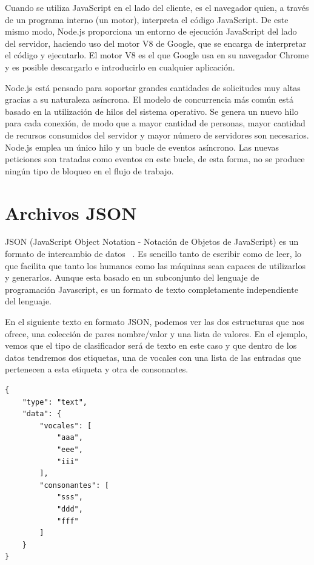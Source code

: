 \documentclass[a4paper, 12pt]{book}
\begin{document}
Cuando se utiliza JavaScript en el lado del cliente, es el navegador quien, a través de un programa interno (un motor), interpreta el código JavaScript. De este mismo modo, Node.js proporciona un entorno de ejecución JavaScript del lado del servidor, haciendo uso del motor V8 de Google, que se encarga de interpretar el código y ejecutarlo.
El motor V8 es el que Google usa en su navegador Chrome y es posible descargarlo e introducirlo en cualquier aplicación.

Node.js está pensado para soportar grandes cantidades de solicitudes muy altas gracias a su naturaleza asíncrona. El modelo de concurrencia más común está basado en la utilización de hilos del sistema operativo. Se genera un nuevo hilo para cada conexión, de modo que a mayor cantidad de personas, mayor cantidad de recursos consumidos del servidor y mayor número de servidores son necesarios. Node.js emplea un único hilo y un bucle de eventos asíncrono. Las nuevas peticiones son tratadas como eventos en este bucle, de esta forma, no se produce ningún tipo de bloqueo en el flujo de trabajo.

\section{Archivos JSON} 
\label{sec:archivosjson}

JSON (JavaScript Object Notation - Notación de Objetos de JavaScript) es un formato de intercambio de datos ~\cite{json}. Es sencillo tanto de escribir como de leer, lo que facilita que tanto los humanos como las máquinas sean capaces de utilizarlos y generarlos. Aunque esta basado en un subconjunto del lenguaje de programación Javascript, es un formato de texto completamente independiente del lenguaje.

En el siguiente texto en formato JSON, podemos ver las dos estructuras que nos ofrece, una colección de pares nombre/valor y una lista de valores. En el ejemplo, vemos que el tipo de clasificador será de texto en este caso y que dentro de los datos tendremos dos etiquetas, una de vocales con una lista de las entradas que pertenecen a esta etiqueta y otra de consonantes. 

\begin{verbatim}
{
    "type": "text",
    "data": {
        "vocales": [
            "aaa",
            "eee",
            "iii"
        ],
        "consonantes": [
            "sss",
            "ddd",
            "fff"
        ]
    }
}
\end{verbatim}
\end{document}
